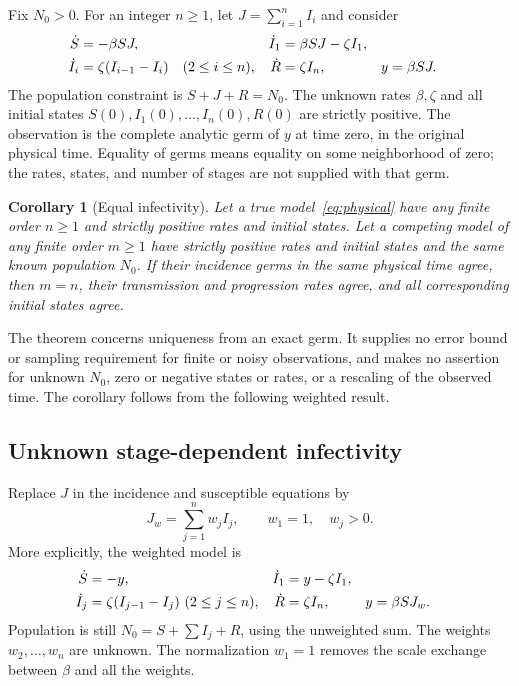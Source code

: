 \documentclass[11pt]{article}
\newtheorem{corollary}[theorem]{Corollary}
\theoremstyle{remark}\newtheorem{remark}[theorem]{Remark}
\begin{document}
Fix $N_0>0$. For an integer $n\geq1$, let $J=\sum_{i=1}^n I_i$ and consider
\begin{align}
 \dot S&=-\beta SJ,& \dot I_1&=\beta SJ-\zeta I_1,\notag\\
 \dot I_i&=\zeta(I_{i-1}-I_i)\quad(2\leq i\leq n),&
 \dot R&=\zeta I_n, & y&=\beta SJ.\label{eq:physical}
\end{align}
The population constraint is $S+J+R=N_0$. The unknown rates $\beta,\zeta$ and all initial states $S(0),I_1(0),\ldots,I_n(0),R(0)$ are strictly positive. The observation is the complete analytic germ of $y$ at time zero, in the original physical time. Equality of germs means equality on some neighborhood of zero; the rates, states, and number of stages are not supplied with that germ.

\begin{corollary}[Equal infectivity]\label{cor:equal}
Let a true model~\eqref{eq:physical} have any finite order $n\geq1$ and strictly positive rates and initial states. Let a competing model of any finite order $m\geq1$ have strictly positive rates and initial states and the same known population $N_0$. If their incidence germs in the same physical time agree, then $m=n$, their transmission and progression rates agree, and all corresponding initial states agree.
\end{corollary}

The theorem concerns uniqueness from an exact germ. It supplies no error bound or sampling requirement for finite or noisy observations, and makes no assertion for unknown $N_0$, zero or negative states or rates, or a rescaling of the observed time. The corollary follows from the following weighted result.

\subsection{Unknown stage-dependent infectivity}
Replace $J$ in the incidence and susceptible equations by
\[
 J_w=\sum_{j=1}^n w_jI_j,\qquad w_1=1,\quad w_j>0.
\]
More explicitly, the weighted model is
\begin{align}
 \dot S&=-y,& \dot I_1&=y-\zeta I_1,\notag\\
 \dot I_j&=\zeta(I_{j-1}-I_j)\ (2\leq j\leq n),&
 \dot R&=\zeta I_n,& y&=\beta S J_w.\label{eq:weighted}
\end{align}
Population is still $N_0=S+\sum I_j+R$, using the unweighted sum. The weights $w_2,\ldots,w_n$ are unknown. The normalization $w_1=1$ removes the scale exchange between $\beta$ and all the weights.
\end{document}
